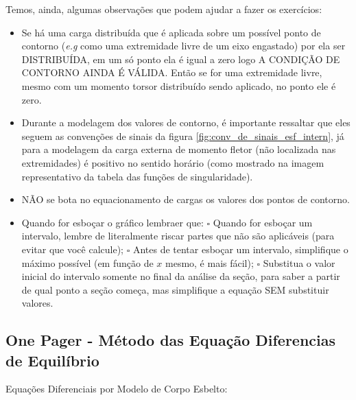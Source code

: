 \documentclass{article}
\begin{document}
Temos, ainda, algumas observações que podem ajudar a fazer os exercícios:
\begin{itemize}
    \item Se há uma carga distribuída que é aplicada sobre um possível ponto de contorno (\emph{e.g} como uma extremidade livre de um eixo engastado) por ela ser DISTRIBUÍDA, em um só
          ponto ela é igual a zero logo A CONDIÇÃO DE CONTORNO AINDA É VÁLIDA. Então se for uma extremidade livre, mesmo com um momento torsor distribuído sendo aplicado, no ponto ele é zero.
    \item Durante a modelagem dos valores de contorno, é importante ressaltar que eles seguem as convenções de sinais da figura \ref{fig:conv_de_sinais_esf_intern}, já para a modelagem da
          carga externa de momento fletor (não localizada nas extremidades) é positivo no sentido horário (como mostrado na imagem representativo da tabela das funções de singularidade).
    \item NÃO se bota no equacionamento de cargas os valores dos pontos de contorno.
    \item Quando for esboçar o gráfico lembraer que:
          \subitem $\square$ Quando for esboçar um intervalo, lembre de literalmente riscar partes que não são aplicáveis (para evitar que você calcule);
          \subitem $\square$ Antes de tentar esboçar um intervalo, simplifique o máximo possível (em função de $x$ mesmo, é mais fácil);
          \subitem $\square$ Substitua o valor inicial do intervalo somente no final da análise da seção, para saber a partir de qual ponto a seção começa, mas simplifique a equação SEM substituir valores.
\end{itemize}

\newpage
\subsection{One Pager - Método das Equação Diferencias de Equilíbrio}

Equações Diferenciais por Modelo de Corpo Esbelto:
\end{document}
